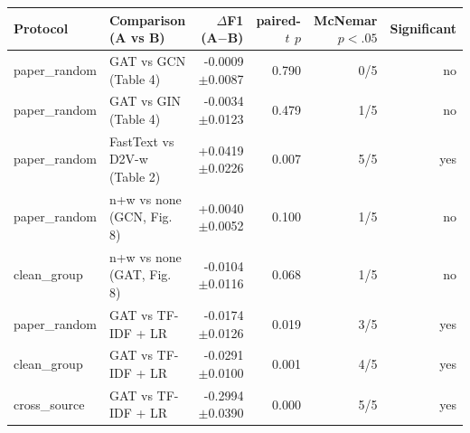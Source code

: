 \begin{tabular}{@{}llrrrr@{}}
\toprule
Protocol & Comparison (A vs B) & $\Delta$F1 (A$-$B) & paired-$t$ $p$ & McNemar $p<.05$ & Significant \\ \midrule
paper\_random & GAT vs GCN (Table 4) & -0.0009$\pm$0.0087 & 0.790 & 0/5 & no \\
paper\_random & GAT vs GIN (Table 4) & -0.0034$\pm$0.0123 & 0.479 & 1/5 & no \\
paper\_random & FastText vs D2V-w (Table 2) & +0.0419$\pm$0.0226 & 0.007 & 5/5 & yes \\
paper\_random & n+w vs none (GCN, Fig. 8) & +0.0040$\pm$0.0052 & 0.100 & 1/5 & no \\
clean\_group & n+w vs none (GAT, Fig. 8) & -0.0104$\pm$0.0116 & 0.068 & 1/5 & no \\
paper\_random & GAT vs TF-IDF + LR & -0.0174$\pm$0.0126 & 0.019 & 3/5 & yes \\
clean\_group & GAT vs TF-IDF + LR & -0.0291$\pm$0.0100 & 0.001 & 4/5 & yes \\
cross\_source & GAT vs TF-IDF + LR & -0.2994$\pm$0.0390 & 0.000 & 5/5 & yes \\
\bottomrule
\end{tabular}
